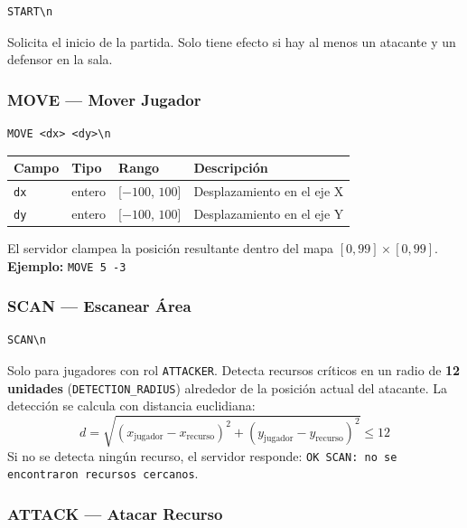 \documentclass[12pt, letterpaper]{article}
\begin{document}
\begin{lstlisting}
START\n
\end{lstlisting}

Solicita el inicio de la partida. Solo tiene efecto si hay al menos un atacante y un defensor en la sala.

\subsubsection{MOVE --- Mover Jugador}

\begin{lstlisting}
MOVE <dx> <dy>\n
\end{lstlisting}

\begin{table}[H]
\centering
\begin{tabularx}{\textwidth}{l l l X}
\toprule
\textbf{Campo} & \textbf{Tipo} & \textbf{Rango} & \textbf{Descripción} \\
\midrule
\texttt{dx} & entero & {[}$-100$, $100${]} & Desplazamiento en el eje X \\
\texttt{dy} & entero & {[}$-100$, $100${]} & Desplazamiento en el eje Y \\
\bottomrule
\end{tabularx}
\end{table}

El servidor clampea la posición resultante dentro del mapa $[0, 99] \times [0, 99]$. \\
\textbf{Ejemplo:} \texttt{MOVE 5 -3}

\subsubsection{SCAN --- Escanear Área}

\begin{lstlisting}
SCAN\n
\end{lstlisting}

Solo para jugadores con rol \texttt{ATTACKER}. Detecta recursos críticos en un radio de \textbf{12 unidades} (\texttt{DETECTION\_RADIUS}) alrededor de la posición actual del atacante. La detección se calcula con distancia euclidiana:
\[
    d = \sqrt{(x_\text{jugador} - x_\text{recurso})^2 + (y_\text{jugador} - y_\text{recurso})^2} \leq 12
\]
Si no se detecta ningún recurso, el servidor responde: \texttt{OK SCAN: no se encontraron recursos cercanos}.

\subsubsection{ATTACK --- Atacar Recurso}
\end{document}
